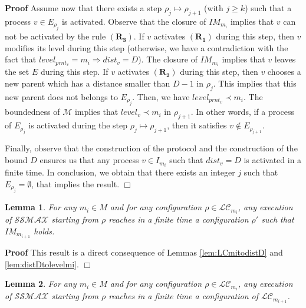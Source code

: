 \documentclass[11pt]{article}
\newenvironment{proof}{\noindent\textbf{Proof}}{\hfill\qed}
\newcommand{\qed}{\hfill$\Box$}
\newtheorem{lem}{Lemma}
\newenvironment{lemma}[1]{\vspace{-0.25cm}\begin{lem}#1}{\end{lem}\vspace{-0.3cm}}
\begin{document}
\begin{proof}
Assume now that there exists a step $\rho_j\mapsto \rho_{j+1}$ (with $j\geq k$) such that a process $v\in E_{\rho_j}$ is activated. Observe that the closure of $IM_{m_i}$ implies that $v$ can not be activated by the rule $\boldsymbol{(R_3)}$. If $v$ activates $\boldsymbol{(R_1)}$ during this step, then $v$ modifies its level during this step (otherwise, we have a contradiction with the fact that $level_{prnt_v}=m_i\Rightarrow dist_v=D$). The closure of $IM_{m_i}$ implies that $v$ leaves the set $E$ during this step. If $v$ activates $\boldsymbol{(R_2)}$ during this step, then $v$ chooses a new parent which has a distance smaller than $D-1$ in $\rho_j$. This implies that this new parent does not belongs to $E_{\rho_j}$. Then, we have $level_{prnt_v}\prec m_i$. The boundedness of $\mathcal{M}$ implies that $level_v\prec m_i$ in $\rho_{j+1}$. In other words, if a process of $E_{\rho_j}$ is activated during the step $\rho_j\mapsto \rho_{j+1}$, then it satisfies $v\notin E_{\rho_{j+1}}$.

Finally, observe that the construction of the protocol and the construction of the bound $D$ ensures us that any process $v\in I_{m_i}$ such that $dist_v=D$ is activated in a finite time. In conclusion, we obtain that there exists an integer $j$ such that $E_{\rho_j}=\emptyset$, that implies the result.
\end{proof}

\begin{lemma}\label{lem:CmitoIMmi+1}
For any $m_i\in M$ and for any configuration $\rho\in \mathcal{LC}_{m_i}$, any execution of $\mathcal{SSMAX}$ starting from $\rho$ reaches in a finite time a configuration $\rho'$ such that $IM_{m_{i+1}}$ holds.
\end{lemma}

\begin{proof}
This result is a direct consequence of Lemmas \ref{lem:LCmitodistD} and \ref{lem:distDtolevelmi}.
\end{proof}

\begin{lemma}\label{lem:LCmitoLCmi+1}
For any $m_i\in M$ and for any configuration $\rho\in \mathcal{LC}_{m_i}$, any execution of $\mathcal{SSMAX}$ starting from $\rho$ reaches in a finite time a configuration of $\mathcal{LC}_{m_{i+1}}$.
\end{lemma}
\end{document}
